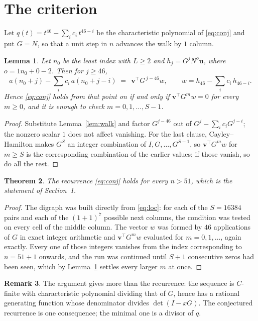 \documentclass[11pt,a4paper]{article}
\theoremstyle{plain}
\newtheorem{theorem}{Theorem}
\newtheorem{lemma}[theorem]{Lemma}
\theoremstyle{definition}
\newtheorem{remark}[theorem]{Remark}
\begin{document}
\section{The criterion}

Let $q(t)=t^{46}-\sum_i c_i\,t^{46-i}$ be the characteristic polynomial of
\eqref{eq:conj} and put $G=N$, so that a unit step in $n$ advances the walk by
$1$ column.

\begin{lemma}\label{lem:crit}
Let $n_0$ be the least index with $L\ge2$ and $h_j=G^{j}N^{o}\mathbf{u}$, where
$o=1n_0+0-2$. Then for $j\ge46$,
\[
a(n_0+j)-\sum_i c_i\,a(n_0+j-i)\;=\;\,\mathbf{v}^{\!\top}G^{\,j-46}w,
\qquad w=h_{46}-\sum_i c_i\,h_{46-i} .
\]
Hence \eqref{eq:conj} holds from that point on if and only if
$\mathbf{v}^{\!\top}G^{m}w=0$ for every $m\ge0$, and it is enough to check
$m=0,1,\dots,S-1$.
\end{lemma}

\begin{proof}
Substitute Lemma~\ref{lem:walk} and factor $G^{j-46}$ out of
$G^{j}-\sum_ic_iG^{j-i}$; the nonzero scalar $1$ does not affect
vanishing. For the last clause, Cayley--Hamilton makes $G^{S}$ an integer combination of
$I,G,\dots,G^{S-1}$, so $\mathbf{v}^{\!\top}G^{m}w$ for $m\ge S$ is the corresponding
combination of the earlier values; if those vanish, so do all the rest.
\end{proof}

\begin{theorem}
The recurrence \eqref{eq:conj} holds for every $n>51$, which is the statement of
Section~1.
\end{theorem}

\begin{proof}
The digraph was built directly from \eqref{eq:loc}: for each of the $S=16384$ pairs and each
of the $(1+1)^{7}$ possible next columns, the condition was tested on every cell of
the middle column. The vector $w$ was formed by $46$ applications of $G$ in exact integer
arithmetic and $\mathbf{v}^{\!\top}G^{m}w$ evaluated for $m=0,1,\dots$, again exactly.
Every one of those integers vanishes from the index corresponding to $n=51+1$ onwards,
and the run was continued until $S+1$ consecutive zeros had been seen, which by
Lemma~\ref{lem:crit} settles every larger $m$ at once.
\end{proof}

\begin{remark}
The argument gives more than the recurrence: the sequence is $C$-finite with characteristic
polynomial dividing that of $G$, hence has a rational generating function whose denominator
divides $\det(I-xG)$. The conjectured recurrence is one consequence; the minimal one is a
divisor of $q$.
\end{remark}
\end{document}
